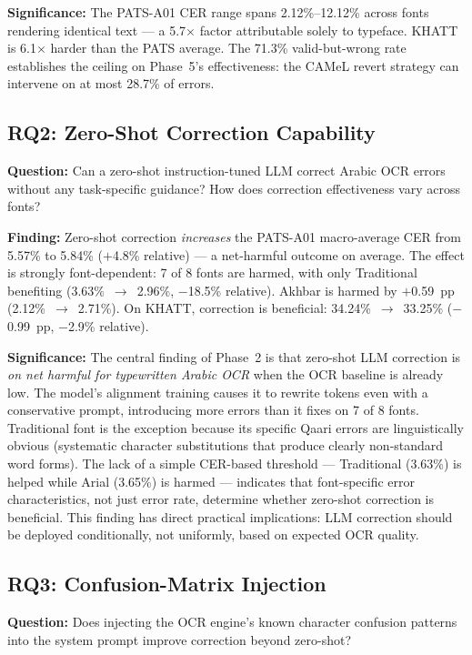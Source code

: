 \textbf{Significance:} The PATS-A01 CER range spans 2.12\%--12.12\% across
fonts rendering identical text --- a 5.7$\times$ factor attributable solely
to typeface. KHATT is 6.1$\times$ harder than the PATS average. The 71.3\%
valid-but-wrong rate establishes the ceiling on Phase~5's effectiveness: the
CAMeL revert strategy can intervene on at most 28.7\% of errors.

\subsection*{RQ2: Zero-Shot Correction Capability}

\textbf{Question:} Can a zero-shot instruction-tuned LLM correct Arabic OCR
errors without any task-specific guidance? How does correction effectiveness
vary across fonts?

\textbf{Finding:} Zero-shot correction \emph{increases} the PATS-A01
macro-average CER from 5.57\% to 5.84\% ($+$4.8\% relative) --- a net-harmful
outcome on average. The effect is strongly font-dependent: 7 of 8 fonts are
harmed, with only Traditional benefiting (3.63\%~$\to$~2.96\%, $-$18.5\%
relative). Akhbar is harmed by $+$0.59~pp (2.12\%~$\to$~2.71\%). On KHATT,
correction is beneficial: 34.24\%~$\to$~33.25\% ($-$0.99~pp, $-$2.9\%
relative).

\textbf{Significance:} The central finding of Phase~2 is that zero-shot LLM
correction is \emph{on net harmful for typewritten Arabic OCR} when the OCR
baseline is already low. The model's alignment training causes it to rewrite
tokens even with a conservative prompt, introducing more errors than it fixes
on 7 of 8 fonts. Traditional font is the exception because its specific
Qaari errors are linguistically obvious (systematic character substitutions
that produce clearly non-standard word forms). The lack of a simple
CER-based threshold --- Traditional (3.63\%) is helped while Arial (3.65\%)
is harmed --- indicates that font-specific error character\-istics, not just
error rate, determine whether zero-shot correction is beneficial. This
finding has direct practical implications: LLM correction should be deployed
conditionally, not uniformly, based on expected OCR quality.

\subsection*{RQ3: Confusion-Matrix Injection}

\textbf{Question:} Does injecting the OCR engine's known character confusion
patterns into the system prompt improve correction beyond zero-shot?


